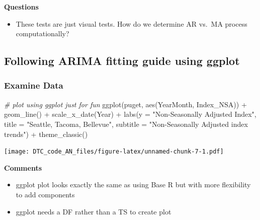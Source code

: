 \documentclass[
]{article}
\newenvironment{Shaded}{\begin{snugshade}}{\end{snugshade}}
\newcommand{\AttributeTok}[1]{\textcolor[rgb]{0.77,0.63,0.00}{#1}}
\newcommand{\CommentTok}[1]{\textcolor[rgb]{0.56,0.35,0.01}{\textit{#1}}}
\newcommand{\FunctionTok}[1]{\textcolor[rgb]{0.00,0.00,0.00}{#1}}
\newcommand{\NormalTok}[1]{#1}
\newcommand{\SpecialCharTok}[1]{\textcolor[rgb]{0.00,0.00,0.00}{#1}}
\newcommand{\StringTok}[1]{\textcolor[rgb]{0.31,0.60,0.02}{#1}}
\providecommand{\tightlist}{%
  \setlength{\itemsep}{0pt}\setlength{\parskip}{0pt}}
\begin{document}
\textbf{Questions}

\begin{itemize}
\tightlist
\item
  These tests are just visual tests. How do we determine AR vs.~MA
  process computationally?
\end{itemize}

\hypertarget{following-arima-fitting-guide-using-ggplot}{%
\subsection{Following ARIMA fitting guide using
ggplot}\label{following-arima-fitting-guide-using-ggplot}}

\hypertarget{examine-data}{%
\subsubsection{Examine Data}\label{examine-data}}

\begin{Shaded}
\begin{Highlighting}[]
\CommentTok{\# plot using ggplot just for fun}
\FunctionTok{ggplot}\NormalTok{(puget, }\FunctionTok{aes}\NormalTok{(YearMonth, Index\_NSA)) }\SpecialCharTok{+} 
  \FunctionTok{geom\_line}\NormalTok{() }\SpecialCharTok{+} \FunctionTok{scale\_x\_date}\NormalTok{(}\StringTok{\textquotesingle{}Year\textquotesingle{}}\NormalTok{) }\SpecialCharTok{+} 
  \FunctionTok{labs}\NormalTok{(}\AttributeTok{y =} \StringTok{"Non{-}Seasonally Adjusted Index"}\NormalTok{,}
       \AttributeTok{title =} \StringTok{"Seattle, Tacoma, Bellevue"}\NormalTok{,}
       \AttributeTok{subtitle =} \StringTok{"Non{-}Seasonally Adjusted index trends"}\NormalTok{) }\SpecialCharTok{+}
  \FunctionTok{theme\_classic}\NormalTok{()}
\end{Highlighting}
\end{Shaded}

\texttt{[image: DTC\_code\_AN\_files/figure-latex/unnamed-chunk-7-1.pdf]}

\textbf{Comments}

\begin{itemize}
\tightlist
\item
  ggplot plot looks exactly the same as using Base R but with more
  flexibility to add components
\item
  ggplot needs a DF rather than a TS to create plot
\end{itemize}
\end{document}
